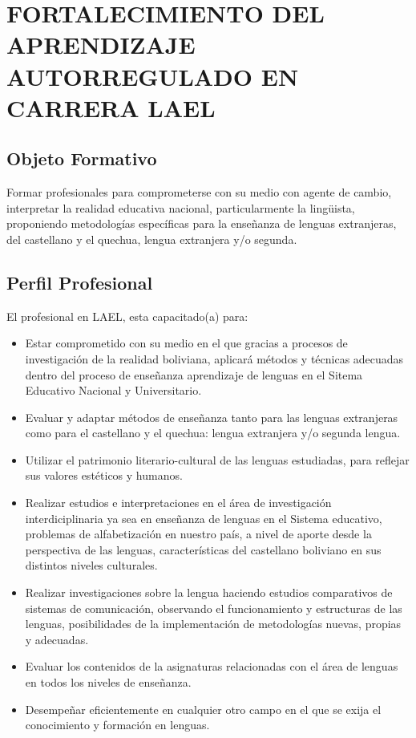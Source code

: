 \chapter{FORTALECIMIENTO DEL APRENDIZAJE AUTORREGULADO EN CARRERA LAEL}

\section{Objeto Formativo}

Formar profesionales para comprometerse con su medio con agente de cambio, 
interpretar la realidad educativa nacional, particularmente la ling\"{u}ista,
proponiendo metodolog\'{i}as espec\'{i}ficas para la ense\~{n}anza de lenguas
extranjeras, del castellano y el quechua, lengua extranjera y/o segunda.

\section{Perfil Profesional}

El profesional en LAEL, esta capacitado(a) para:

\begin{itemize}
\item Estar comprometido con su medio en el que gracias a procesos de 
investigaci\'{o}n de la realidad boliviana, aplicar\'{a} m\'{e}todos
y t\'{e}cnicas adecuadas dentro del proceso de ense\~{n}anza aprendizaje
de lenguas en el Sitema Educativo Nacional y Universitario.

\item Evaluar y adaptar m\'{e}todos de ense\~{n}anza tanto para las lenguas
extranjeras como para el castellano y el quechua: lengua extranjera y/o 
segunda lengua.

\item Utilizar el patrimonio literario-cultural de las lenguas estudiadas,
para reflejar sus valores est\'{e}ticos y humanos.

\item Realizar estudios e interpretaciones en el \'{a}rea de investigaci\'{o}n
interdiciplinaria ya sea en ense\~{n}anza de lenguas en el Sistema educativo,
problemas de alfabetizaci\'{o}n en nuestro pa\'{i}s, a nivel de aporte desde
la perspectiva de las lenguas, caracter\'{i}sticas del castellano boliviano
en sus distintos niveles culturales.

\item Realizar investigaciones sobre la lengua haciendo estudios comparativos
de sistemas de comunicaci\'{o}n, observando el funcionamiento y estructuras de
las lenguas, posibilidades de la implementaci\'{o}n de metodolog\'{i}as nuevas,
propias y adecuadas.

\item Evaluar los contenidos de la asignaturas relacionadas con el \'{a}rea de
lenguas en todos los niveles de ense\~{n}anza.

\item Desempe\~{n}ar eficientemente en cualquier otro campo en el que se exija
el conocimiento y formaci\'{o}n en lenguas.

\end{itemize}


